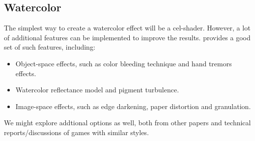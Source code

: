 \documentclass[acmtog, table, dvipsnames]{acmart}
\begin{document}
\subsection{Watercolor}
The simplest way to create a watercolor effect will be a cel-shader. However, a lot of additional features can be implemented to improve the results. \cite{montesdeoca2016art} provides a good set of such features, including: 
\begin{itemize}
   \item Object-space effects, such as color bleeding technique and hand tremors effects.
   \item Watercolor reflectance model and pigment turbulence.
   \item Image-space effects, such as edge darkening, paper distortion and granulation.
\end{itemize}
We might explore addtional options as well, both from other papers and technical reports/discussions of games with similar styles.
\end{document}
